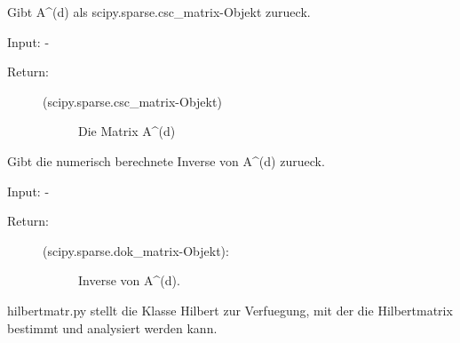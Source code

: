 \documentclass[letterpaper,10pt,ngerman]{sphinxmanual}
\begin{document}
\begin{fulllineitems}
\begin{fulllineitems}
\begin{description}
\begin{description}
\end{description}

\end{description}

\end{fulllineitems}


\begin{fulllineitems}
\label{\detokenize{index:sparse_erw.Sparse.return_mat_d_csc}}
Gibt A\textasciicircum{}(d) als scipy.sparse.csc\_matrix-Objekt zurueck.

Input: -
\begin{description}
\item[{Return:}] \leavevmode\begin{description}
\item[{(scipy.sparse.csc\_matrix-Objekt)}] \leavevmode
Die Matrix A\textasciicircum{}(d)

\end{description}

\end{description}

\end{fulllineitems}


\begin{fulllineitems}
\label{\detokenize{index:sparse_erw.Sparse.return_mat_d_inv}}
Gibt die numerisch berechnete Inverse von A\textasciicircum{}(d) zurueck.

Input: -
\begin{description}
\item[{Return:}] \leavevmode\begin{description}
\item[{(scipy.sparse.dok\_matrix-Objekt):}] \leavevmode
Inverse von A\textasciicircum{}(d).

\end{description}

\end{description}

\end{fulllineitems}


\end{fulllineitems}

\label{\detokenize{index:module-hilbertmatr}}
hilbertmatr.py stellt die Klasse Hilbert zur Verfuegung, mit der die Hilbertmatrix bestimmt und
analysiert werden kann.
\end{document}
